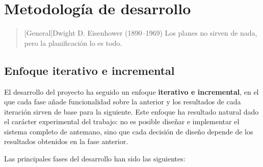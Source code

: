 \chapter{Metodología de desarrollo}

\begin{quotation}[General]{Dwight D. Eisenhower (1890--1969)}
Los planes no sirven de nada, pero la planificación lo es todo.
\end{quotation}

\begin{abstract}
Este capítulo describe el enfoque metodológico adoptado para el desarrollo del proyecto, incluyendo la organización iterativa del trabajo, el control de versiones y las herramientas y entornos de desarrollo utilizados.
\end{abstract}

\section{Enfoque iterativo e incremental}

El desarrollo del proyecto ha seguido un enfoque \textbf{iterativo e incremental}, en el que cada fase añade funcionalidad sobre la anterior y los resultados de cada iteración sirven de base para la siguiente. Este enfoque ha resultado natural dado el carácter experimental del trabajo: no es posible diseñar e implementar el sistema completo de antemano, sino que cada decisión de diseño depende de los resultados obtenidos en la fase anterior.

Las principales fases del desarrollo han sido las siguientes:


